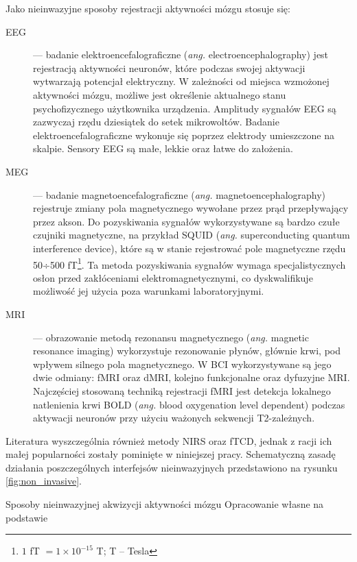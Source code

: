 \documentclass[skorowidz,skroty]{dyplomWEZUT}
\begin{document}
Jako nieinwazyjne sposoby rejestracji aktywności mózgu stosuje się:
\begin{description}
    \item [EEG] --- badanie elektroencefalograficzne (\textit{ang.} electroencephalography) jest rejestracją aktywności neuronów, które podczas swojej aktywacji wytwarzają potencjał elektryczny. W zależności od miejsca wzmożonej aktywności mózgu, możliwe jest określenie aktualnego stanu psychofizycznego użytkownika urządzenia. Amplitudy sygnałów EEG są zazwyczaj rzędu dziesiątek do setek mikrowoltów\cite{bci_signals_invasive}. Badanie elektroencefalograficzne wykonuje się poprzez elektrody umieszczone na skalpie. Sensory EEG są małe,  lekkie oraz łatwe do założenia\cite{bci_trends,bci_signals_invasive}.
    \item [MEG] --- badanie magnetoencefalograficzne (\textit{ang.} magnetoencephalography) rejestruje zmiany pola magnetycznego wywołane przez prąd przepływający przez akson. Do pozyskiwania sygnałów wykorzystywane są bardzo czułe czujniki magnetyczne, na przykład SQUID (\textit{ang.} superconducting quantum interference device), które są w stanie rejestrować pole magnetyczne rzędu 50÷500 fT\footnote{$1$ fT $ = 1 \times 10^{-15}$ T; T -- Tesla}\cite{bci_signals_invasive}. Ta metoda pozyskiwania sygnałów wymaga specjalistycznych osłon przed zakłóceniami elektromagnetycznymi, co dyskwalifikuje możliwość jej użycia poza warunkami laboratoryjnymi.
    \item [MRI] --- obrazowanie metodą rezonansu magnetycznego (\textit{ang.} magnetic resonance imaging) wykorzystuje rezonowanie płynów, głównie krwi, pod wpływem silnego pola magnetycznego\cite{bci_signals_invasive}. W BCI wykorzystywane są jego dwie odmiany: fMRI oraz dMRI, kolejno funkcjonalne oraz dyfuzyjne MRI. Najczęściej stosowaną techniką rejestracji fMRI jest detekcja lokalnego natlenienia krwi BOLD (\textit{ang.} blood oxygenation level dependent) podczas aktywacji neuronów przy użyciu ważonych sekwencji T2-zależnych\cite{bci_neuroimaging}. 
\end{description}
Literatura \cite{bci_neuroimaging} wyszczególnia również metody NIRS oraz fTCD, jednak z racji ich małej popularności zostały pominięte w niniejszej pracy. Schematyczną zasadę działania poszczególnych interfejsów nieinwazyjnych przedstawiono na rysunku \vref{fig:non_invasive}.

{Sposoby nieinwazyjnej akwizycji aktywności mózgu\label{fig:non_invasive}}
{Opracowanie własne na podstawie \cite{bci_neuroimaging}}
\end{document}
